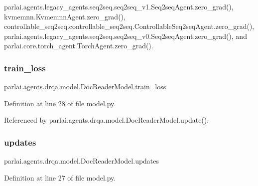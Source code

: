 parlai.\+agents.\+legacy\+\_\+agents.\+seq2seq.\+seq2seq\+\_\+v1.\+Seq2seq\+Agent.\+zero\+\_\+grad(), kvmemnn.\+Kvmemnn\+Agent.\+zero\+\_\+grad(), controllable\+\_\+seq2seq.\+controllable\+\_\+seq2seq.\+Controllable\+Seq2seq\+Agent.\+zero\+\_\+grad(), parlai.\+agents.\+legacy\+\_\+agents.\+seq2seq.\+seq2seq\+\_\+v0.\+Seq2seq\+Agent.\+zero\+\_\+grad(), and parlai.\+core.\+torch\+\_\+agent.\+Torch\+Agent.\+zero\+\_\+grad().

\mbox{\label{classparlai_1_1agents_1_1drqa_1_1model_1_1DocReaderModel_aaea517209501c80d5d8b86fa666c8dc6}} 
\subsubsection{\texorpdfstring{train\+\_\+loss}{train\_loss}}
{\footnotesize\ttfamily parlai.\+agents.\+drqa.\+model.\+Doc\+Reader\+Model.\+train\+\_\+loss}



Definition at line 28 of file model.\+py.



Referenced by parlai.\+agents.\+drqa.\+model.\+Doc\+Reader\+Model.\+update().

\mbox{\label{classparlai_1_1agents_1_1drqa_1_1model_1_1DocReaderModel_aa614f2c9cef3332b2af7a48552820f17}} 
\subsubsection{\texorpdfstring{updates}{updates}}
{\footnotesize\ttfamily parlai.\+agents.\+drqa.\+model.\+Doc\+Reader\+Model.\+updates}



Definition at line 27 of file model.\+py.



